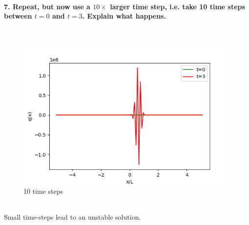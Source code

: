 \paragraph{7. Repeat, but now use a $10\times$ larger time 
    step, i.e. take 10 time steps between $t=0$ and $t=3$. 
    Explain what happens.
} \ \\
    \begin{figure}[h!]
        \centering
        \includegraphics[width=.6\textwidth]{../figures/upwind_7.png}
        \caption{10 time steps}
    \end{figure} \ \\ 
    Small time-steps lead to an unstable solution.

